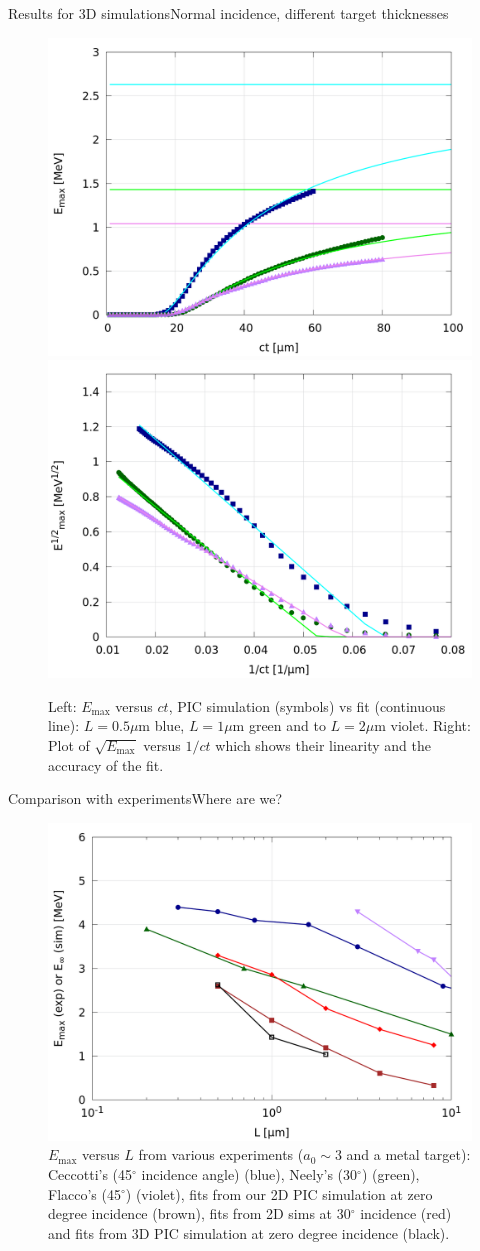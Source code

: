 \documentclass[final]{beamer}
\def\Emax{E_{\mathrm{max}}}
\begin{document}
\begin{frame}{Results for 3D simulations}{Normal incidence, different target thicknesses}
\begin{figure}
\centering
\includegraphics[width=0.45 \textwidth]{figs/Fig_5b.png}
\includegraphics[width=0.45 \textwidth]{figs/Fig_6.png}
\caption{
Left: $\Emax$ versus $ct$, PIC simulation (symbols) vs fit (continuous line): $L=0.5 \mu$m blue, $L=1 \mu$m green and to $L=2 \mu$m violet. Right: Plot of $\sqrt{E_{\mathrm{max}}}$ versus $1/ct$ which shows their linearity and the accuracy of the fit.
}
\end{figure}
\end{frame}




\begin{frame}{Comparison with experiments}{Where are we?}
\begin{figure}
\centering
\includegraphics[width=0.45 \textwidth]{figs/Fig_7.png}
\caption{
$\Emax$ versus $L$ from various experiments ($a_0 \sim 3$ and a metal target): Ceccotti's (45$^\circ$ incidence angle) (blue), Neely's  (30$^\circ$) (green), Flacco's (45$^\circ$) (violet), fits from our 2D PIC simulation at zero degree incidence (brown), fits from 2D sims at 30$^\circ$ incidence (red) and fits from 3D PIC simulation at zero degree incidence (black).
}
\end{figure}
\end{frame}
\end{document}
